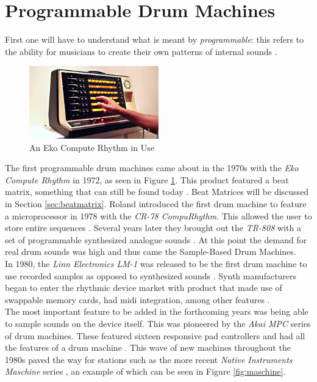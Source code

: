 \documentclass[12pt,a4paper]{report}
\begin{document}
\section{Programmable Drum Machines}
First one will have to understand what is meant by \textit{programmable}: this refers to the ability for musicians to create their own patterns of internal sounds \cite{rhythmart}.\\
\begin{figure}[h!]
	\begin{center}
		\includegraphics[width = 0.5\textwidth, angle=0, origin=c]{computerhythm.jpg}
		\caption{An Eko Compute Rhythm in Use \cite{comprhythImg}}
		\label{fig:comprhyt}
	\end{center}
\end{figure}
The first programmable drum machines came about in the 1970s with the \textit{Eko Compute Rhythm} in 1972, as seen in Figure \ref{fig:comprhyt}. This product featured a beat matrix, something that can still be found today \cite{beatgoeson}. Beat Matrices will be discussed in Section \ref{sec:beatmatrix}. Roland introduced the first drum machine to feature a microprocessor in 1978 with the \textit{CR-78 CompuRhythm}. This allowed the user to store entire sequences \cite{cr78}. Several years later they brought out the \textit{TR-808} with a set of programmable synthesized analogue sounds \cite{tr808, beatgoeson}. At this point the demand for real drum sounds was high and thus came the Sample-Based Drum Machines.\\
In 1980, the \textit{Linn Electronics LM-1} was released to be the first drum machine to use recorded samples as opposed to synthesized sounds \cite{beatgoeson}. Synth manufacturers began to enter the rhythmic device market with product that made use of swappable memory cards, had \ac{midi} integration, among other features \cite{rhythmart}.\\
The most important feature to be added in the forthcoming years was being able to sample sounds on the device itself. This was pioneered by the \textit{Akai MPC} series of drum machines. These featured sixteen responsive pad controllers and had all the features of a drum machine \cite{beatgoeson, rhythmart}. This wave of new machines throughout the 1980s paved the way for stations such as the more recent \textit{Native Instruments Maschine} series \cite{rhythmart}, an example of which can be seen in Figure \ref{fig:maschine}.\\
\end{document}
